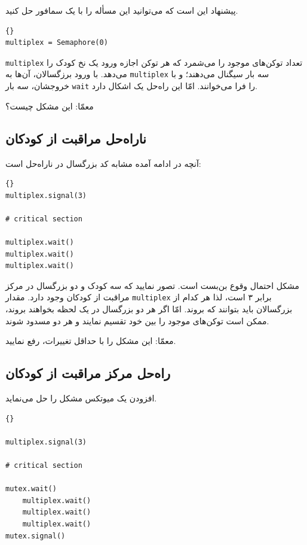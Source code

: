 \documentclass{book}
\newcommand{\clearemptydoublepage}{}%
\begin{document}
    پیشنهاد  این است که می‌توانید این مسأله را  با یک سمافور حل کنید. 

\begin{latin}
\begin{lstlisting}[title=\rl{راهنمایی مراقبت از کودکان}]{}
multiplex = Semaphore(0)
\end{lstlisting}
\end{latin}

    {\tt multiplex} 
    تعداد توکن‌های موجود را می‌شمرد که هر توکن اجازه ورود یک نخ کودک را می‌دهد. 
    با ورود برزگسالان، آن‌ها به {\tt multiplex} سه بار سیگنال می‌دهند؛ و با خروجشان، سه بار {\tt wait} را فرا می‌خوانند. 
    امّا این راه‌حل یک اشکال دارد. 

    معمّا: این مشکل چیست؟


\clearemptydoublepage
\subsection {ناراه‌حل مراقبت از کودکان}

    آنچه در ادامه آمده مشابه کد بزرگسال در ناراه‌حل  است: 

\begin{latin}
\begin{lstlisting}[title=\rl{ناراه‌حل مراقبت از کودکان (بزرگسال)}]{}
multiplex.signal(3)

# critical section

multiplex.wait()
multiplex.wait()
multiplex.wait()
\end{lstlisting}
\end{latin}

    مشکل احتمال وقوع بن‌بست است. تصور نمایید که سه کودک و دو بزرگسال در مرکز مراقبت از کودکان وجود دارد. 
    مقدار {\tt multiplex} برابر ۳ است، لذا هر کدام از بزرگسالان باید بتوانند که بروند. 
    امّا اگر هر دو بزرگسال در یک لحظه بخواهند بروند، ممکن است توکن‌های موجود را بین خود تقسیم نمایند و هر دو مسدود شوند. 

    معمّا: این مشکل را با حداقل تغییرات، رفع نمایید. 


\clearemptydoublepage
    \subsection{راه‌حل مرکز مراقبت از کودکان}        

    افزودن یک میوتکس مشکل را حل می‌نماید. 

\begin{latin}
\begin{lstlisting}[title=\rl{راه‌حل مرکز مراقبت از کودکان (بزرگسال)}]{}
     
multiplex.signal(3)

# critical section

mutex.wait()
    multiplex.wait()
    multiplex.wait()
    multiplex.wait()
mutex.signal()
\end{lstlisting}
\end{latin}
\end{document}
